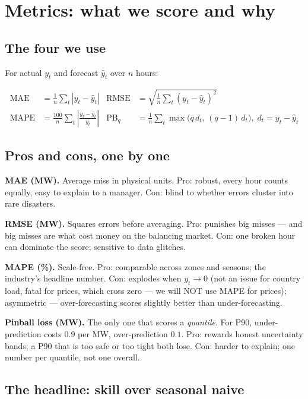 \section{Metrics: what we score and why}

\subsection{The four we use}

For actual $y_t$ and forecast $\hat{y}_t$ over $n$ hours:

\begin{align}
  \mathrm{MAE}  &= \tfrac{1}{n}\sum_t |y_t - \hat{y}_t|
  &\mathrm{RMSE} &= \sqrt{\tfrac{1}{n}\sum_t (y_t - \hat{y}_t)^2} \\
  \mathrm{MAPE} &= \tfrac{100}{n}\sum_t \left|\tfrac{y_t - \hat{y}_t}{y_t}\right|
  &\mathrm{PB}_q &= \tfrac{1}{n}\sum_t \max\!\big(q\,d_t,\,(q-1)\,d_t\big),\; d_t = y_t - \hat{y}_t
\end{align}

\subsection{Pros and cons, one by one}

\textbf{MAE (MW).} Average miss in physical units.
Pro: robust, every hour counts equally, easy to explain to a manager.
Con: blind to whether errors cluster into rare disasters.

\textbf{RMSE (MW).} Squares errors before averaging.
Pro: punishes big misses --- and big misses are what cost money on the
balancing market. Con: one broken hour can dominate the score; sensitive to
data glitches.

\textbf{MAPE (\%).} Scale-free.
Pro: comparable across zones and seasons; the industry's headline number.
Con: explodes when $y_t \to 0$ (not an issue for country load, fatal for
prices, which cross zero --- we will NOT use MAPE for prices);
asymmetric --- over-forecasting scores slightly better than under-forecasting.

\textbf{Pinball loss (MW).} The only one that scores a \emph{quantile}.
For P90, under-prediction costs $0.9$ per MW, over-prediction $0.1$.
Pro: rewards honest uncertainty bands; a P90 that is too safe or too tight
both lose. Con: harder to explain; one number per quantile, not one overall.

\subsection{The headline: skill over seasonal naive}

